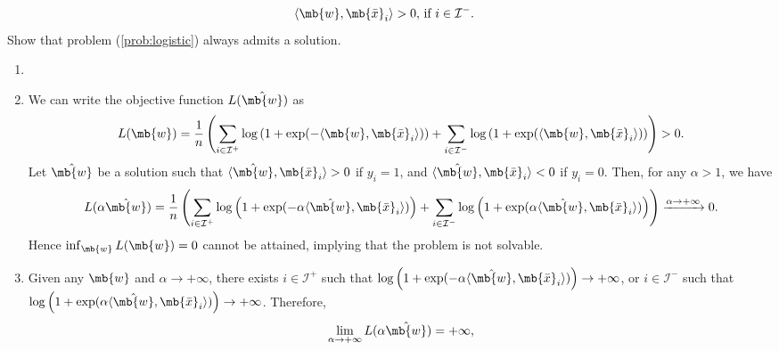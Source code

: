 \begin{exercise}
\begin{enumerate}
\begin{enumerate}
                    \begin{align*}
                         & \langle \mb{w}, \mb{\bar{x}}_i\rangle> 0,\,\text{if\ } i\in\mathcal{I}^-.
                    \end{align*}
                    Show that problem (\ref{prob:logistic}) always admits a solution.
            \end{enumerate}
            \begin{solution}
                \begin{enumerate}
                    \item []
                    \item We can write the objective function $L(\hat{\mb{w}})$ as
                        \begin{align*}
                            L(\mb{w}) = \frac{1}{n}\left(\sum_{i\in \mathcal{I}^+} \log \left( 1 + \exp(-\langle \mb{w}, \mb{\bar{x}}_i\rangle) \right) + \sum_{i\in \mathcal{I}^-} \log \left( 1 + \exp(\langle \mb{w}, \mb{\bar{x}}_i\rangle) \right)\right) > 0.
                        \end{align*}
                        Let $\hat{\mb{w}}$ be a solution such that $\langle \hat{\mb{w}}, \mb{\bar{x}}_i\rangle>0$ if $y_i = 1$, and $\langle \hat{\mb{w}}, \mb{\bar{x}}_i\rangle<0$ if $y_i = 0$. Then, for any $\alpha > 1$, we have
                        \begin{align*}
                            L(\alpha \hat{\mb{w}})  = \frac{1}{n}\left(\sum_{i\in \mathcal{I}^+} \log \left( 1 + \exp(-\alpha\langle \hat{\mb{w}}, \mb{\bar{x}}_i\rangle) \right) + \sum_{i\in \mathcal{I}^-} \log \left( 1 + \exp(\alpha\langle \hat{\mb{w}}, \mb{\bar{x}}_i\rangle) \right)\right) \xrightarrow{\alpha \to +\infty} 0.
                        \end{align*}
                        Hence $\inf_\mb{w} L(\mb{w}) = 0$ cannot be attained, implying that the problem is not solvable.
                    \item
                        Given any $\mb{w}$ and $\alpha \to +\infty$, there exists $ i \in \mathcal{I}^+ $ such that $\log \left( 1 + \exp(-\alpha\langle \hat{\mb{w}}, \mb{\bar{x}}_i\rangle) \right) \to +\infty$, or $i\in\mathcal{I}^- $ such that $\log \left( 1 + \exp(\alpha\langle \hat{\mb{w}}, \mb{\bar{x}}_i\rangle) \right) \to +\infty$. Therefore,
                        \begin{align*}
                            \lim_{\alpha\to+\infty}L(\alpha \hat{\mb{w}}) = +\infty,
                        \end{align*}

\end{enumerate}
\end{solution}
\end{enumerate}
\end{exercise}

